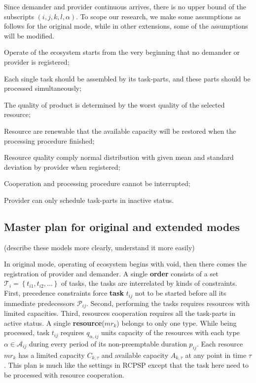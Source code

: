 Since demander and provider continuous arrives, there is no upper bound of the subscripts
$(i,j,k,l,\alpha)$.
To scope our research, we make some assumptions as follows for the original mode, while in other extensions, some of the assumptions will be modified.
\begin{compactitem}
\item Operate of the ecosystem starts from the very beginning that no demander or provider is registered;
\item Each single task should be assembled by its task-parts, and these parts should be processed simultaneously;
\item The quality of product is determined by the worst quality of the selected resource;
\item Resource are renewable that the available capacity will be restored when the processing procedure finished;
\item Resource quality comply normal distribution with given mean and standard deviation by provider when registered;
\item Cooperation and processing procedure cannot be interrupted;
\item Provider can only schedule task-parts in inactive status.
\end{compactitem}



\subsection{Master plan for original and extended modes} %
\label{ssub:master_plam}
(describe these models more clearly, understand it more easily)

In original mode, operating of ecosystem begins with void, then there comes the registration of provider and demander. A single \textbf{order} consists of a set $\mathcal{T}_i = \left\{ t_{i1},t_{i2},\dots\right\}$ of tasks, the tasks are interrelated by kinds of constraints. First, precedence constraints force \textbf{task} $t_{ij}$ not to be started before all its immediate predecessors $\mathcal{P}_{ij}$. Second, performing the tasks requires resources with limited capacities. Third, resources cooperation requires all the task-parts in active status.
A single \textbf{resource}($mr_k$) belongs to only one type. While being processed, task $t_{ij}$ requires $q_{\alpha,ij}$ units capacity of the resources with each type $\alpha\in\mathcal{A}_{ij}$ during every period of its non-preemptable duration $p_{ij}$. Each resource $mr_k$ has a limited capacity $C_{k,\tau}$ and available capacity $A_{k,\tau}$ at any point in time $\tau$. This plan is much like the settings in RCPSP\cite{Kolisch1999} except that the task here need to be processed with resource cooperation.

